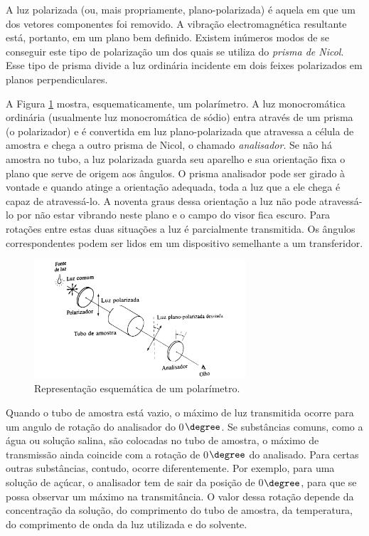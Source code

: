 A luz polarizada (ou, mais propriamente, plano-polarizada) é aquela em que um dos vetores componentes foi removido. A vibração electromagnética resultante está, portanto, em um plano bem definido. Existem inúmeros modos de se conseguir este tipo de polarização um dos quais se utiliza do \textit{prisma de Nicol}. Esse tipo de prisma divide a luz ordinária incidente em dois feixes polarizados em planos perpendiculares.

A Figura \ref{figura_6_2} mostra, esquematicamente, um polarímetro. A luz monocromática ordinária (usualmente luz monocromática de sódio) entra através de um prisma (o polarizador) e é convertida em luz plano-polarizada que atravessa a célula de amostra e chega a outro prisma de Nicol, o chamado \textit{analisador}. Se não há amostra no tubo, a luz polarizada guarda seu aparelho e sua orientação fixa o plano que serve de origem aos ângulos. O prisma analisador pode ser girado à vontade e quando atinge a orientação adequada, toda a luz que a ele chega é capaz de atravessá-lo. A noventa graus dessa orientação a luz não pode atravessá-lo por não estar vibrando neste plano e o campo do visor fica escuro. Para rotações entre estas duas situações a luz é parcialmente transmitida. Os ângulos correspondentes podem ser lidos em um dispositivo semelhante a um transferidor.

\begin{figure}
    \centering
    \includegraphics[width=0.7\textwidth,angle=0]{content/images/Figura_6_2.pdf}
    \caption{Representação esquemática de um polarímetro.}
    \label{figura_6_2}
\end{figure}

Quando o tubo de amostra está vazio, o máximo de luz transmitida ocorre para um angulo de rotação do analisador do 0$\degree$. Se substâncias comuns, como a água ou solução salina, são colocadas no tubo de amostra, o máximo de transmissão ainda coincide com a rotação de 0$\degree$ do analisado. Para certas outras substâncias, contudo, ocorre diferentemente. Por exemplo, para uma solução de açúcar,  o analisador tem de sair da posição de 0$\degree$, para que se possa observar um máximo na transmitância. O valor dessa rotação depende da concentração da solução, do comprimento do tubo de amostra, da temperatura, do comprimento de onda da luz utilizada e do solvente.

